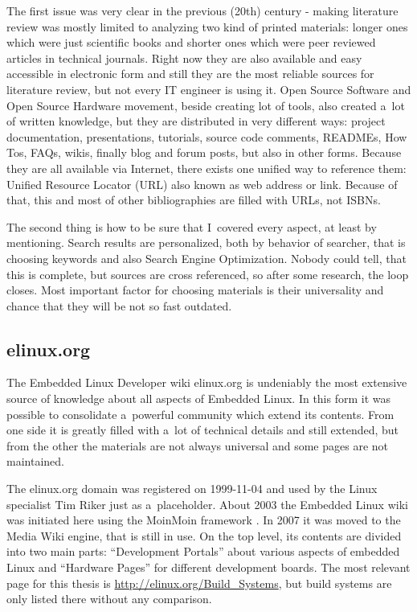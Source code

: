 \documentclass[printmode]{mgr}
\begin{document}
The first issue was very clear in the previous (20th) century - making literature review was mostly limited to analyzing two kind of printed materials: longer ones which were just scientific books and shorter ones which were peer reviewed articles in technical journals.
Right now they are also available and easy accessible in electronic form and still they are the most reliable sources for literature review, but not every IT engineer is using it.
Open Source Software and Open Source Hardware movement, beside creating lot of tools, also created a~lot of written knowledge, but they are distributed in very different ways: project documentation, presentations, tutorials, source code comments, READMEs, How Tos, FAQs, wikis, finally blog and forum posts, but also in other forms.
Because they are all available via Internet, there exists one unified way to reference them: Unified Resource Locator (URL) also known as web address or link.
Because of that, this and most of other bibliographies are filled with URLs, not ISBNs.

The second thing is how to be sure that I~covered every aspect, at least by mentioning. Search results are personalized, both by behavior of searcher, that is choosing keywords and also Search Engine Optimization.
Nobody could tell, that this is complete, but sources are cross referenced, so after some research, the loop closes.
Most important factor for choosing materials is their universality and chance that they will be not so fast outdated.

\subsection*{elinux.org}

The Embedded Linux Developer wiki elinux.org is undeniably the most extensive source of knowledge about all aspects of Embedded Linux.
In this form it was possible to consolidate a~powerful community which extend its contents.
From one side it is greatly filled with a~lot of technical details and still extended, but from the other the materials are not always universal and some pages are not maintained.

The elinux.org domain was registered on 1999-11-04 \cite{web:whois-elinux} and used by the Linux specialist Tim Riker just as a~placeholder.\cite{web:riker}\cite{web:elinux-placeholder}
About 2003 the Embedded Linux wiki was initiated here using the MoinMoin framework \cite{web:elinux-moinmoin}.
In 2007 it was moved to the Media Wiki engine, that is still in use.
On the top level, its contents are divided into two main parts: ``Development Portals'' about various aspects of embedded Linux and ``Hardware Pages'' for different development boards.
The most relevant page for this thesis is \url{http://elinux.org/Build_Systems}, but build systems are only listed there without any comparison.
\end{document}
